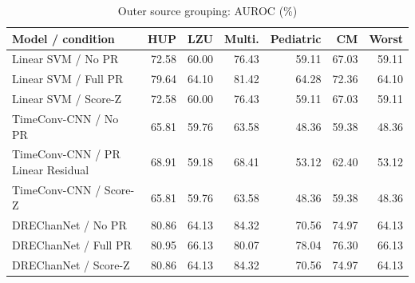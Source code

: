 \begin{table}[t]
\centering
\caption{Outer source grouping: AUROC (\%)}
\small
\begin{tabular}{lrrrrrr}
\toprule
Model / condition & HUP & LZU & Multi. & Pediatric & CM & Worst \\
\midrule
Linear SVM / No PR & 72.58 & 60.00 & 76.43 & 59.11 & 67.03 & 59.11 \\
Linear SVM / Full PR & 79.64 & 64.10 & 81.42 & 64.28 & 72.36 & 64.10 \\
Linear SVM / Score-Z & 72.58 & 60.00 & 76.43 & 59.11 & 67.03 & 59.11 \\
TimeConv-CNN / No PR & 65.81 & 59.76 & 63.58 & 48.36 & 59.38 & 48.36 \\
TimeConv-CNN / PR Linear Residual & 68.91 & 59.18 & 68.41 & 53.12 & 62.40 & 53.12 \\
TimeConv-CNN / Score-Z & 65.81 & 59.76 & 63.58 & 48.36 & 59.38 & 48.36 \\
DREChanNet / No PR & 80.86 & 64.13 & 84.32 & 70.56 & 74.97 & 64.13 \\
DREChanNet / Full PR & 80.95 & 66.13 & 80.07 & 78.04 & 76.30 & 66.13 \\
DREChanNet / Score-Z & 80.86 & 64.13 & 84.32 & 70.56 & 74.97 & 64.13 \\
\bottomrule
\end{tabular}
\end{table}
